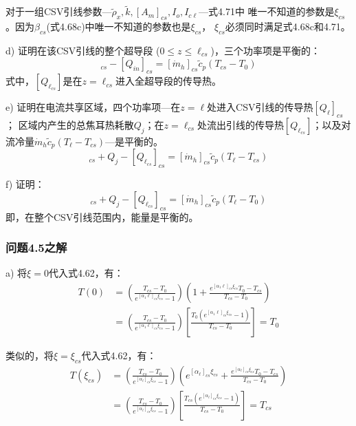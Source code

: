 对于一组CSV引线参数---$\tilde{\rho}_x, \tilde{k}, [A_m]_{cs}, I_o, I_{c\ell}$---式4.71中
唯一不知道的参数是$\xi_{cs}$。因为$\beta_{cs}$(式4.68c)中唯一不知道的参数也是$\xi_{cs}$，
$\xi_{cs}$必须同时满足式4.68c和4.71。

d) 证明在该CSV引线的整个超导段 ($0\le z\le \ell_{cs}$)，三个功率项是平衡的： 
\begin{equation}%
[Q_{\ell_{cs}}]_{cs}-[Q_{in}]_{cs}=[\dot{m}_h]_{cs}\tilde{c}_p(T_{cs}-T_0)
\end{equation}
式中，$[Q_{\ell_{cs}}]$是在$z=\ell_{cs}$进入全超导段的传导热。

e) 证明在电流共享区域，四个功率项---在$z =\ell$处进入CSV引线的传导热$[Q_\ell]_{cs}$；
区域内产生的总焦耳热耗散$Q_j$；在$z =\ell_{cs}$处流出引线的传导热$[Q_{\ell_{cs}}]$；以及对流冷量$\dot{m}_h \tilde{c}_p (T_\ell-T_{cs})$---是平衡的。
\begin{equation}%
[Q_\ell]_{cs}+Q_j-[Q_{\ell_{cs}}]_{cs}=[\dot{m}_h]_{cs}\tilde{c}_p(T_\ell-T_{cs})
\end{equation}

f) 证明：
\begin{equation}%
[Q_\ell]_{cs}+Q_j-[Q_{\ell_{cs}}]_{cs}=[\dot{m}_h]_{cs}\tilde{c}_p(T_\ell-T_0)
\end{equation}
即，在整个CSV引线范围内，能量是平衡的。


\subsubsection{问题4.5之解}
a) 将$\xi=0$代入式4.62，有：
\begin{align*}
T(0)&=\left(\frac{T_{cs}-T_0}{e^{[\alpha_{1}\ell]_{cs}\xi_{cs}}-1}\right)\left(1+\frac{e^{[\alpha_{1}\ell]_{cs}\xi_{cs}}T_0-T_{cs}}{T_{cs}-T_0}\right)\\
&=\left(\frac{T_{cs}-T_0}{e^{[\alpha_{1}\ell]_{cs}\xi_{cs}}-1}\right)\left[\frac{T_0({e^{[\alpha_{1}\ell]_{cs}\xi_{cs}}-1})}{T_{cs}-T_0}\right]=T_0 \tag{S5.1}
\end{align*}

类似的，将$\xi=\xi_{cs}$代入式4.62，有：
\begin{align*}
T(\xi_{cs})&=\left(\frac{T_{cs}-T_0}{e^{[\alpha_\ell]_{cs}\xi_{cs}}-1}\right)\left(e^{[\alpha_\ell]_{cs}\xi_{cs}}+\frac{e^{[\alpha_\ell]_{cs}\xi_{cs}}T_0-T_{cs}}{T_{cs}-T_0}\right)\\ &=\left(\frac{T_{cs}-T_0}{e^{[\alpha_\ell]_{cs}\xi_{cs}}-1}\right)\left[\frac{T_{cs}(e^{[\alpha_\ell]_{cs}\xi_{cs}}-1)}{T_{cs}-T_0}\right]=T_{cs} \tag{S5.2}
\end{align*}

